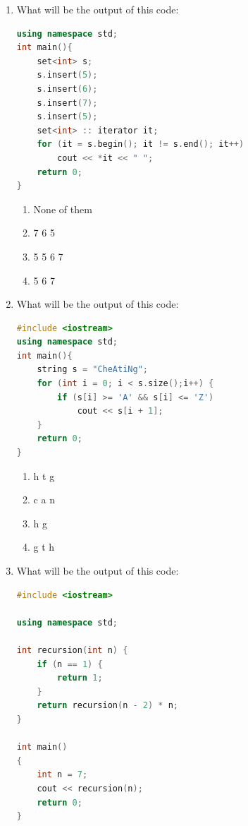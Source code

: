\documentclass[10pt]{article}
\begin{document}
\begin{enumerate}
\item What will be the output of this code:
\begin{lstlisting}[language=C++]
using namespace std;
int main(){
    set<int> s;
    s.insert(5);
    s.insert(6);
    s.insert(7);
    s.insert(5);
    set<int> :: iterator it;
    for (it = s.begin(); it != s.end(); it++)
        cout << *it << " ";
    return 0;
}
\end{lstlisting}
\begin{multicols}{4}
\begin{enumerate}
    \item None of them 
    \item 7 6 5
    \item 5 5 6 7
    \item 5 6 7 
\end{enumerate}
\end{multicols}










\item What will be the output of this code:
\begin{lstlisting}[language=C++]
#include <iostream>
using namespace std;
int main(){
    string s = "CheAtiNg";
    for (int i = 0; i < s.size();i++) {
        if (s[i] >= 'A' && s[i] <= 'Z')
            cout << s[i + 1];
    }
    return 0;
}
\end{lstlisting}
\begin{multicols}{4}
\begin{enumerate}
    \item h t g
    \item c a n
    \item h g
    \item g t h 
\end{enumerate}
\end{multicols}







\item What will be the output of this code:
\begin{lstlisting}[language=C++]
#include <iostream>

using namespace std;

int recursion(int n) {
    if (n == 1) {
        return 1;
    }
    return recursion(n - 2) * n;
}

int main()
{
    int n = 7;
    cout << recursion(n);
    return 0;
}


\end{lstlisting}
\end{enumerate}
\end{document}
